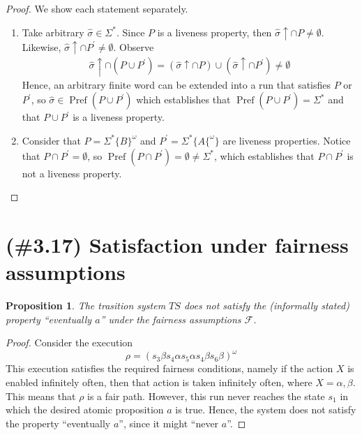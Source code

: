 \documentclass[letterpaper,11pt]{article}
\newtheorem{prop}{Proposition}
\newcommand{\union}{\cup}
\newcommand{\intersn}{\cap}
\newcommand{\up}{\uparrow}
\DeclareMathOperator{\Pref}{Pref}
\begin{document}
\begin{proof}
    We show each statement separately.

    \begin{enumerate}
        \item
            Take arbitrary $\hat \sigma \in \Sigma^*$. Since $P$ is a liveness
            property, then $\hat \sigma \up \intersn P \neq \emptyset$.
            Likewise, $\hat \sigma \up \intersn P^\prime \neq \emptyset$.
            Observe
            \begin{align*}
                \hat \sigma \up \intersn (P \union P^\prime)
                = (\hat \sigma \up \intersn P)
                \union (\hat \sigma \up \intersn P^\prime)
                \neq \emptyset
            \end{align*}
            Hence, an arbitrary finite word can be extended into a run that
            satisfies $P$ or $P^\prime$, so
            $\hat \sigma \in \Pref(P \union P^\prime)$ which establishes that
            $\Pref(P \union P^\prime) = \Sigma^*$ and that $P \union P^\prime$
            is a liveness property.

        \item
            Consider that
            $P = \Sigma^* \{B\}^\omega$ and
            $P^\prime = \Sigma^* \{A\{^\omega\}$ are liveness properties.
            Notice that $P \intersn P^\prime = \emptyset$,
            so $\Pref(P \intersn P^\prime) = \emptyset \neq \Sigma^*$, which
            establishes that $P \intersn P^\prime$ is not a liveness property.
    \end{enumerate}
\end{proof}

\section{(\#3.17) Satisfaction under fairness assumptions}

\begin{prop}
    The trasition system $TS$ does not satisfy the (informally stated) property
    ``eventually $a$'' under the fairness assumptions $\mathcal{F}$.
\end{prop}

\begin{proof}
    Consider the execution
    \begin{equation*}
        \rho = (s_3 \beta s_4 \alpha s_5 \alpha s_4 \beta s_6 \beta)^\omega
    \end{equation*}
    This execution satisfies the required fairness conditions, namely if
    the action $X$ is enabled infinitely often, then that action is taken
    infinitely often, where $X = \alpha, \beta$. This means that $\rho$ is a
    fair path. However, this run never reaches the state $s_1$ in which the
    desired atomic proposition $a$ is true. Hence, the system does not satisfy
    the property ``eventually $a$'', since it might ``never $a$''.
\end{proof}
\end{document}
